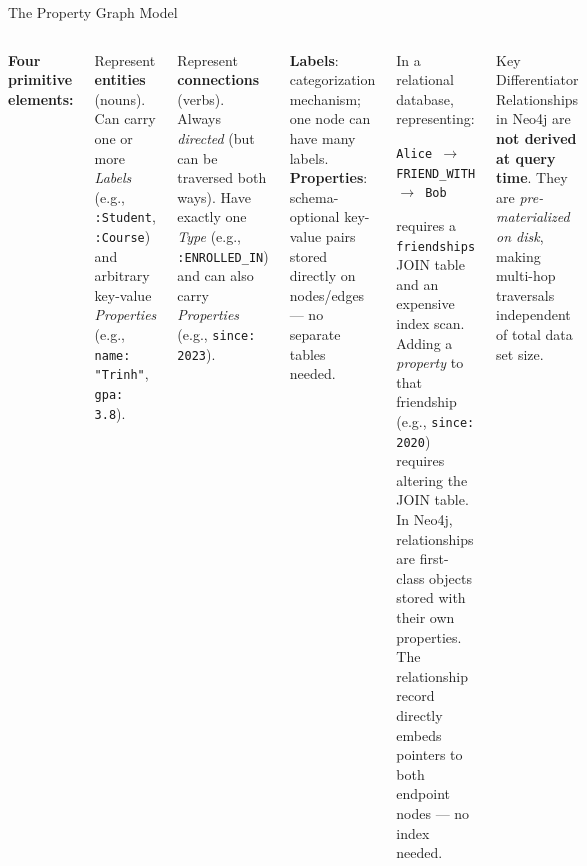 \documentclass[aspectratio=169]{beamer}
\begin{document}
\begin{frame}{The Property Graph Model}
  \begin{columns}[T]
      \textbf{Four primitive elements:}
      \vspace{0.2cm}
      \begin{tcolorbox}[neo4jbox, title=1. Nodes (Vertices)]
        \scriptsize
        Represent \textbf{entities} (nouns). Can carry one or more \textit{Labels} (e.g., \texttt{:Student}, \texttt{:Course}) and arbitrary key-value \textit{Properties} (e.g., \texttt{name: "Trinh"}, \texttt{gpa: 3.8}).
      \end{tcolorbox}
      \begin{tcolorbox}[neo4jbox, title=2. Relationships (Edges)]
        \scriptsize
        Represent \textbf{connections} (verbs). Always \textit{directed} (but can be traversed both ways). Have exactly one \textit{Type} (e.g., \texttt{:ENROLLED\_IN}) and can also carry \textit{Properties} (e.g., \texttt{since: 2023}).
      \end{tcolorbox}
      \begin{tcolorbox}[neo4jbox, title=3. Labels \& 4. Properties]
        \scriptsize
        \textbf{Labels}: categorization mechanism; one node can have many labels. \textbf{Properties}: schema-optional key-value pairs stored directly on nodes/edges — no separate tables needed.
      \end{tcolorbox}
      \begin{tcolorbox}[infobox, title=Why Graph Matters for Relationships]
        \scriptsize
        In a relational database, representing:
        \begin{center}\texttt{Alice $\to$ FRIEND\_WITH $\to$ Bob}\end{center}
        requires a \texttt{friendships} JOIN table and an expensive index scan. Adding a \textit{property} to that friendship (e.g., \texttt{since: 2020}) requires altering the JOIN table. 
        \vspace{0.2cm}
        In Neo4j, relationships are first-class objects stored with their own properties. The relationship record directly embeds pointers to both endpoint nodes — no index needed.
      \end{tcolorbox}
      \vspace{0.3cm}
      \begin{alertblock}{Key Differentiator}
        \small Relationships in Neo4j are \textbf{not derived at query time}. They are \textit{pre-materialized on disk}, making multi-hop traversals independent of total data set size.
      \end{alertblock}
  \end{columns}
\end{frame}
\end{document}
